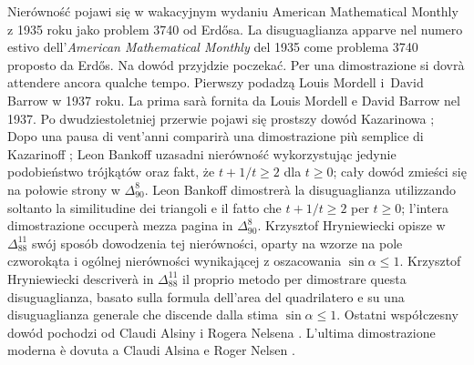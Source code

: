 \begin{figure}[H]
\begin{minipage}[b]{.45\linewidth}
\begin{center}

    \end{center}
    \label{erdos_mordell_barrowb}
\end{minipage}
\caption{}
\end{figure}

\label{subsection_erdos_mordell}
Nierówność pojawi się w wakacyjnym wydaniu American Mathematical Monthly z 1935 roku jako problem 3740 od Erdősa. %
La disuguaglianza apparve nel numero estivo dell'\emph{American Mathematical Monthly} del 1935 come problema 3740 proposto da Erdős. %
%
Na dowód przyjdzie poczekać. %
Per una dimostrazione si dovrà attendere ancora qualche tempo. %
Pierwszy podadzą Louis Mordell i~David Barrow \cite{mordell_barrow_1937} w 1937 roku. %
La prima sarà fornita da Louis Mordell e David Barrow \cite{mordell_barrow_1937} nel 1937. %
%
%
Po dwudziestoletniej przerwie pojawi się prostszy dowód Kazarinowa \cite{kazarinoff_1957}; %
Dopo una pausa di vent'anni comparirà una dimostrazione più semplice di Kazarinoff \cite{kazarinoff_1957}; %
Leon Bankoff \cite{bankoff_1958} uzasadni nierówność wykorzystując jedynie podobieństwo trójkątów oraz fakt, że $t + 1/t \ge 2$ dla $t \ge 0$; cały dowód zmieści się na połowie strony w $\Delta_{90}^8$. %
Leon Bankoff \cite{bankoff_1958} dimostrerà la disuguaglianza utilizzando soltanto la similitudine dei triangoli e il fatto che $t + 1/t \ge 2$ per $t \ge 0$; l'intera dimostrazione occuperà mezza pagina in $\Delta_{90}^8$. %
%
Krzysztof Hryniewiecki opisze w $\Delta_{88}^{11}$ swój sposób dowodzenia tej nierówności, oparty na wzorze na pole czworokąta i ogólnej nierówności wynikającej z oszacowania $\sin \alpha \le 1$. %
Krzysztof Hryniewiecki descriverà in $\Delta_{88}^{11}$ il proprio metodo per dimostrare questa disuguaglianza, basato sulla formula dell'area del quadrilatero e su una disuguaglianza generale che discende dalla stima $\sin \alpha \le 1$. %
Ostatni współczesny dowód pochodzi od Claudi Alsiny i Rogera Nelsena \cite{alsina_2007}. %
L'ultima dimostrazione moderna è dovuta a Claudi Alsina e Roger Nelsen \cite{alsina_2007}. %
%
%

